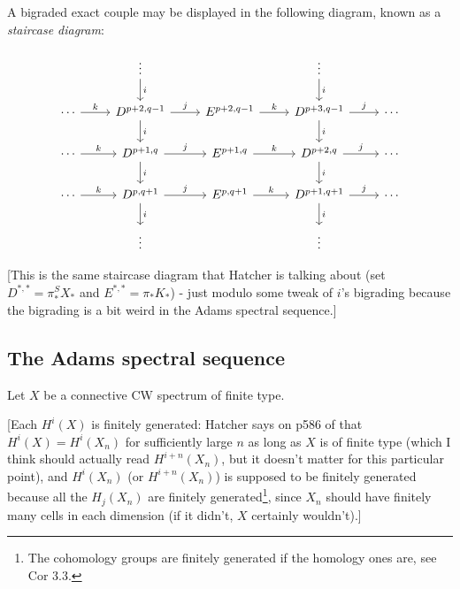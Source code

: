 \documentclass{MetricNotes2023}
\begin{document}
A bigraded exact couple may be displayed in the following diagram, known as a \textit{staircase diagram}:

\[\begin{tikzcd} 
   &  \vdots \arrow[d, "i"] &  & \vdots \arrow[d, "i"] & \\
 \cdots \arrow[r, "k"] & D^{p+2, q-1} \arrow[d, "i"] \arrow[r, "j"] & E^{p+2,q-1}  \arrow[r, "k"] & D^{p+3,q-1} \arrow[d, "i"] \arrow[r, "j"] & \cdots \\
 \cdots \arrow[r, "k"] & D^{p+1,q} \arrow[d, "i"] \arrow[r, "j"] & E^{p+1,q}  \arrow[r, "k"] & D^{p+2,q} \arrow[d, "i"] \arrow[r, "j"] & \cdots \\
 \cdots \arrow[r, "k"] & D^{p,q+1}  \arrow[d, "i"] \arrow[r, "j"] & E^{p,q+1}  \arrow[r, "k"] & D^{p+1,q+1} \arrow[d, "i"] \arrow[r, "j"] & \cdots \\
 & \vdots &  & \vdots & 
\end{tikzcd}\]

[This is the same staircase diagram that Hatcher is talking about (set \(D^{*,*}=\pi_*^SX_*\) and \(E^{*,*}=\pi_*K_*\)) - just modulo some tweak of \(i\)'s bigrading because the bigrading is a bit weird in the Adams spectral sequence.]

\subsection{The Adams spectral sequence}

Let \(X\) be a connective CW spectrum of finite type.

[Each \(H^i(X)\) is finitely generated: Hatcher says on p586 of \autocite{hatcher5} that \(H^i(X)=H^i(X_n)\) for sufficiently large \(n\) as long as \(X\) is of finite type (which I think should actually read \(H^{i+n}(X_n)\), but it doesn't matter for this particular point), and \(H^i(X_n)\) (or \(H^{i+n}(X_n)\)) is supposed to be finitely generated because all the \(H_j(X_n)\) are finitely generated\footnote{The cohomology groups are finitely generated if the homology ones are, see \autocite{hatcher} Cor 3.3.}, since \(X_n\) should have finitely many cells in each dimension (if it didn't, \(X\) certainly wouldn't).]
\end{document}
